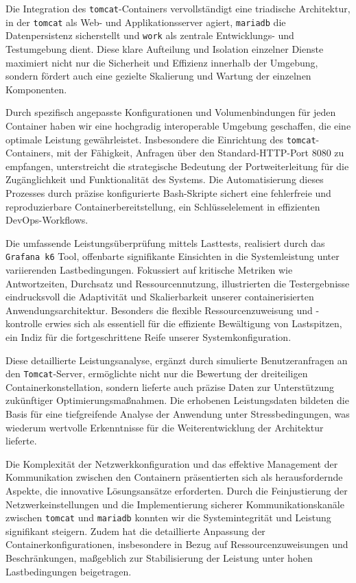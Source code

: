 {Die Integration des \texttt{tomcat}-Containers vervollständigt eine triadische Architektur, in der \texttt{tomcat} als Web- und Applikationsserver agiert, \texttt{mariadb} die Datenpersistenz sicherstellt und \texttt{work} als zentrale Entwicklungs- und Testumgebung dient. Diese klare Aufteilung und Isolation einzelner Dienste maximiert nicht nur die Sicherheit und Effizienz innerhalb der Umgebung, sondern fördert auch eine gezielte Skalierung und Wartung der einzelnen Komponenten.

Durch spezifisch angepasste Konfigurationen und Volumenbindungen für jeden Container haben wir eine hochgradig interoperable Umgebung geschaffen, die eine optimale Leistung gewährleistet. Insbesondere die Einrichtung des \texttt{tomcat}-Containers, mit der Fähigkeit, Anfragen über den Standard-HTTP-Port 8080 zu empfangen, unterstreicht die strategische Bedeutung der Portweiterleitung für die Zugänglichkeit und Funktionalität des Systems. Die Automatisierung dieses Prozesses durch präzise konfigurierte Bash-Skripte sichert eine fehlerfreie und reproduzierbare Containerbereitstellung, ein Schlüsselelement in effizienten DevOps-Workflows.


Die umfassende Leistungsüberprüfung mittels Lasttests, realisiert durch das \texttt{Grafana k6} Tool, offenbarte signifikante Einsichten in die Systemleistung unter variierenden Lastbedingungen. Fokussiert auf kritische Metriken wie Antwortzeiten, Durchsatz und Ressourcennutzung, illustrierten die Testergebnisse eindrucksvoll die Adaptivität und Skalierbarkeit unserer containerisierten Anwendungsarchitektur. Besonders die flexible Ressourcenzuweisung und -kontrolle erwies sich als essentiell für die effiziente Bewältigung von Lastspitzen, ein Indiz für die fortgeschrittene Reife unserer Systemkonfiguration.

Diese detaillierte Leistungsanalyse, ergänzt durch simulierte Benutzeranfragen an den \texttt{Tomcat}-Server, ermöglichte nicht nur die Bewertung der dreiteiligen Containerkonstellation, sondern lieferte auch präzise Daten zur Unterstützung zukünftiger Optimierungsmaßnahmen. Die erhobenen Leistungsdaten bildeten die Basis für eine tiefgreifende Analyse der Anwendung unter Stressbedingungen, was wiederum wertvolle Erkenntnisse für die Weiterentwicklung der Architektur lieferte.



Die Komplexität der Netzwerkkonfiguration und das effektive Management der Kommunikation zwischen den Containern präsentierten sich als herausfordernde Aspekte, die innovative Lösungsansätze erforderten. Durch die Feinjustierung der Netzwerkeinstellungen und die Implementierung sicherer Kommunikationskanäle zwischen \texttt{tomcat} und \texttt{mariadb} konnten wir die Systemintegrität und Leistung signifikant steigern. Zudem hat die detaillierte Anpassung der Containerkonfigurationen, insbesondere in Bezug auf Ressourcenzuweisungen und Beschränkungen, maßgeblich zur Stabilisierung der Leistung unter hohen Lastbedingungen beigetragen.


}
